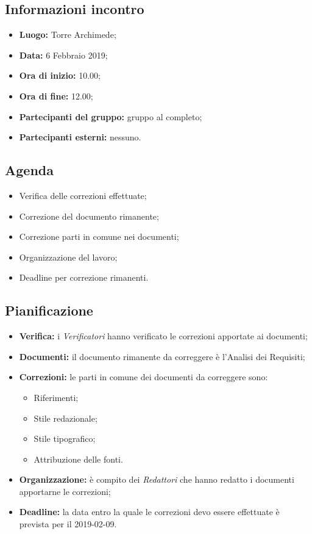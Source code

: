 \subsection{Informazioni incontro}
\begin{itemize}
	\item { \textbf{Luogo:} Torre Archimede};
	\item { \textbf{Data:} 6 Febbraio 2019};
	\item { \textbf{Ora di inizio:} 10.00};
	\item { \textbf{Ora di fine:} 12.00};
	\item { \textbf{Partecipanti del gruppo:} gruppo al completo};
	\item { \textbf{Partecipanti esterni:} nessuno}.
\end{itemize}


\subsection{Agenda}
\begin{itemize}
	\item {Verifica delle correzioni effettuate;}
	\item {Correzione del documento rimanente;}
	\item {Correzione parti in comune nei documenti;}
	\item {Organizzazione del lavoro;}
	\item {Deadline per correzione rimanenti.}
\end{itemize}

\subsection{Pianificazione}
\begin{itemize}
	\item { \textbf{Verifica:} i \emph{Verificatori} hanno verificato le correzioni apportate ai documenti;}
	\item{ \textbf{Documenti:} il documento rimanente da correggere è l'Analisi dei Requisiti;}
	\item { \textbf{Correzioni:} le parti in comune dei documenti da correggere sono: 
		\begin{itemize}
			\item Riferimenti;
			\item Stile redazionale;
			\item Stile tipografico;
			\item Attribuzione delle fonti.
		\end{itemize}
	}	
	\item { \textbf{Organizzazione:} è compito dei \emph{Redattori} che hanno redatto i documenti apportarne le correzioni;}	
	\item { \textbf{Deadline:} la data entro la quale le correzioni devo essere effettuate è prevista per il 2019-02-09.}
\end{itemize}

